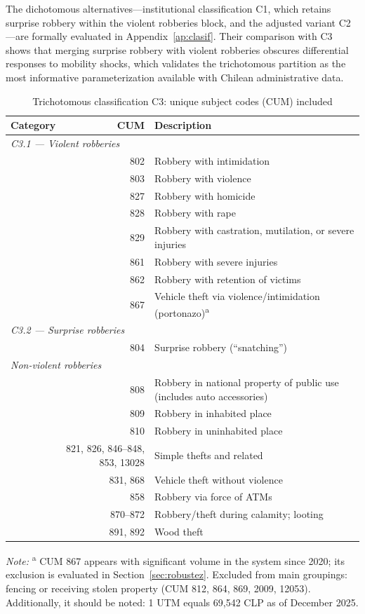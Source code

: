 \documentclass[pdflatex,sn-basic]{sn-jnl}
\newcommand{\tablenote}[1]{%
  \vspace{2pt}\par
  {\footnotesize\textit{Note:} #1\par}
}
\begin{document}
The dichotomous alternatives---institutional classification C1, which retains
surprise robbery within the violent robberies block, and the adjusted
variant C2---are formally evaluated in Appendix~\ref{ap:clasif}. Their
comparison with C3 shows that merging surprise robbery with violent robberies
obscures differential responses to mobility shocks, which validates the
trichotomous partition as the most informative parameterization available
with Chilean administrative data.

\begin{table}[htbp]
\centering
\caption{Trichotomous classification C3: unique subject codes (CUM) included}
\label{tab:c3}
\small
\begin{tabular}{p{3.5cm}rp{7cm}}
\toprule
\textbf{Category} & \textbf{CUM} & \textbf{Description} \\
\midrule
\multicolumn{3}{l}{\textit{C3.1 --- Violent robberies}} \\
 & 802 & Robbery with intimidation \\
 & 803 & Robbery with violence \\
 & 827 & Robbery with homicide \\
 & 828 & Robbery with rape \\
 & 829 & Robbery with castration, mutilation, or severe injuries \\
 & 861 & Robbery with severe injuries \\
 & 862 & Robbery with retention of victims \\
 & 867 & Vehicle theft via violence/intimidation (portonazo)\textsuperscript{a} \\
\midrule
\multicolumn{3}{l}{\textit{C3.2 --- Surprise robberies}} \\
 & 804 & Surprise robbery (``snatching'') \\
\midrule
\midrule
\multicolumn{3}{l}{\textit{Non-violent robberies}} \\
 & 808 & Robbery in national property of public use (includes auto accessories) \\
 & 809 & Robbery in inhabited place \\
 & 810 & Robbery in uninhabited place \\
 & 821, 826, 846--848, 853, 13028 & Simple thefts and related \\
 & 831, 868 & Vehicle theft without violence \\
 & 858 & Robbery via force of ATMs \\
 & 870--872 & Robbery/theft during calamity; looting \\
 & 891, 892 & Wood theft \\
\bottomrule
\end{tabular}
\tablenote{\textsuperscript{a} CUM 867 appears with significant volume in the
system since 2020; its exclusion is evaluated in Section~\ref{sec:robustez}.
Excluded from main groupings: fencing or receiving stolen property (CUM 812, 864, 869, 2009, 12053).
Additionally, it should be noted: 1 UTM equals 69,542 CLP as of December 2025.}
\end{table}
\end{document}
